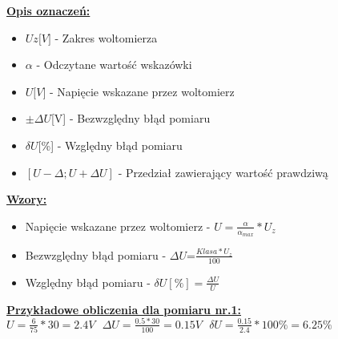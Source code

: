 \documentclass[a4paper,13pt]{extarticle}  %
\begin{document}
                \underline{\textbf{Opis oznaczeń:}}
                \begin{itemize}
                    \item $Uz{[}V{]}$ - Zakres woltomierza
                    \item $\alpha$ - Odczytane wartość wskazówki
                    \item $U{[}V{]}$ - Napięcie wskazane przez woltomierz
                    \item $\pm \Delta U${[}V{]} - Bezwzględny błąd pomiaru
                    \item $\delta U${[}\%{]} - Względny błąd pomiaru
                    \item $[U-\Delta ; U+\Delta U] $ - Przedział zawierający wartość prawdziwą
                \end{itemize}
                \underline{\textbf{Wzory:}}
                \begin{itemize}
                    \item Napięcie wskazane przez woltomierz - $U=\frac{\alpha}{\alpha_{max}}*U_z$
                    \item Bezwzględny błąd pomiaru - $ \Delta U$=$\frac{Klasa*U_z}{100}$
                    \item Względny błąd pomiaru - $\delta U[\%]=\frac{\Delta U}{U}$
                \end{itemize}

                \underline{\textbf{Przykładowe obliczenia dla pomiaru nr.1:}}\\
                $U=\frac{6}{75}\ast 30=2.4V \ \ \ \Delta U=\frac{0.5\ast 30}{100}=0.15V \ \ \ \delta U=\frac{0.15}{2.4}\ast 100\%=6.25\%$\\

                \begin{table}[H]
                    \caption{Wyniki pomiarowe oraz błędy pomiarowe dla ustalonego napięcia $\sim$2V dla woltomierza cyfrowego}
                    \centering
                \end{table}            
\end{document}
